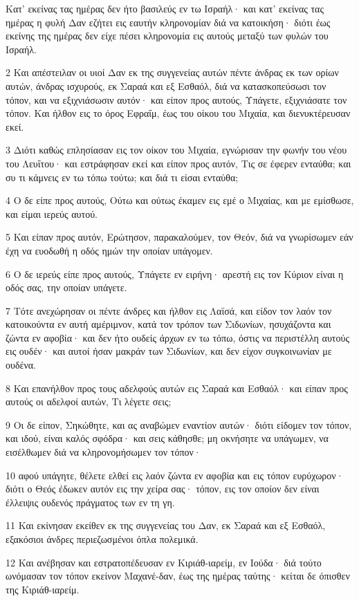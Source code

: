 \par Κατ' εκείνας τας ημέρας δεν ήτο βασιλεύς εν τω Ισραήλ· και κατ' εκείνας τας ημέρας η φυλή Δαν εζήτει εις εαυτήν κληρονομίαν διά να κατοικήση· διότι έως εκείνης της ημέρας δεν είχε πέσει κληρονομία εις αυτούς μεταξύ των φυλών του Ισραήλ.
\par 2 Και απέστειλαν οι υιοί Δαν εκ της συγγενείας αυτών πέντε άνδρας εκ των ορίων αυτών, άνδρας ισχυρούς, εκ Σαραά και εξ Εσθαόλ, διά να κατασκοπεύσωσι τον τόπον, και να εξιχνιάσωσιν αυτόν· και είπον προς αυτούς, Υπάγετε, εξιχνιάσατε τον τόπον. Και ήλθον εις το όρος Εφραΐμ, έως του οίκου του Μιχαία, και διενυκτέρευσαν εκεί.
\par 3 Διότι καθώς επλησίασαν εις τον οίκον του Μιχαία, εγνώρισαν την φωνήν του νέου του Λευΐτου· και εστράφησαν εκεί και είπον προς αυτόν, Τις σε έφερεν ενταύθα; και συ τι κάμνεις εν τω τόπω τούτω; και διά τι είσαι ενταύθα;
\par 4 Ο δε είπε προς αυτούς, Ούτω και ούτως έκαμεν εις εμέ ο Μιχαίας, και με εμίσθωσε, και είμαι ιερεύς αυτού.
\par 5 Και είπαν προς αυτόν, Ερώτησον, παρακαλούμεν, τον Θεόν, διά να γνωρίσωμεν εάν έχη να ευοδωθή η οδός ημών την οποίαν υπάγομεν.
\par 6 Ο δε ιερεύς είπε προς αυτούς, Υπάγετε εν ειρήνη· αρεστή εις τον Κύριον είναι η οδός σας, την οποίαν υπάγετε.
\par 7 Τότε ανεχώρησαν οι πέντε άνδρες και ήλθον εις Λαϊσά, και είδον τον λαόν τον κατοικούντα εν αυτή αμέριμνον, κατά τον τρόπον των Σιδωνίων, ησυχάζοντα και ζώντα εν αφοβία· και δεν ήτο ουδείς άρχων εν τω τόπω, όστις να περιστέλλη αυτούς εις ουδέν· και αυτοί ήσαν μακράν των Σιδωνίων, και δεν είχον συγκοινωνίαν με ουδένα.
\par 8 Και επανήλθον προς τους αδελφούς αυτών εις Σαραά και Εσθαόλ· και είπαν προς αυτούς οι αδελφοί αυτών, Τι λέγετε σεις;
\par 9 Οι δε είπον, Σηκώθητε, και ας αναβώμεν εναντίον αυτών· διότι είδομεν τον τόπον, και ιδού, είναι καλός σφόδρα· και σεις κάθησθε; μη οκνήσητε να υπάγωμεν, να εισέλθωμεν διά να κληρονομήσωμεν τον τόπον·
\par 10 αφού υπάγητε, θέλετε ελθεί εις λαόν ζώντα εν αφοβία και εις τόπον ευρύχωρον· διότι ο Θεός έδωκεν αυτόν εις την χείρα σας· τόπον, εις τον οποίον δεν είναι έλλειψις ουδενός πράγματος των εν τη γη.
\par 11 Και εκίνησαν εκείθεν εκ της συγγενείας του Δαν, εκ Σαραά και εξ Εσθαόλ, εξακόσιοι άνδρες περιεζωσμένοι όπλα πολεμικά.
\par 12 Και ανέβησαν και εστρατοπέδευσαν εν Κιριάθ-ιαρείμ, εν Ιούδα· διά τούτο ωνόμασαν τον τόπον εκείνον Μαχανέ-δαν, έως της ημέρας ταύτης· κείται δε όπισθεν της Κιριάθ-ιαρείμ.
